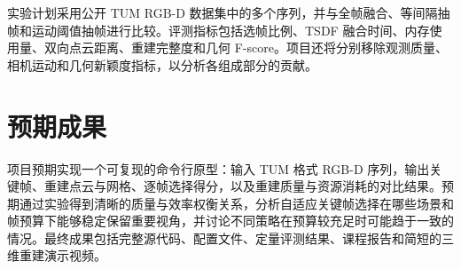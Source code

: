\documentclass[10pt,a4paper]{ctexart}
\begin{document}
实验计划采用公开 TUM RGB-D 数据集中的多个序列，并与全帧融合、等间隔抽帧和运动阈值抽帧进行比较。评测指标包括选帧比例、TSDF 融合时间、内存使用量、双向点云距离、重建完整度和几何 F-score。项目还将分别移除观测质量、相机运动和几何新颖度指标，以分析各组成部分的贡献。

\section{预期成果}
项目预期实现一个可复现的命令行原型：输入 TUM 格式 RGB-D 序列，输出关键帧、重建点云与网格、逐帧选择得分，以及重建质量与资源消耗的对比结果。预期通过实验得到清晰的质量与效率权衡关系，分析自适应关键帧选择在哪些场景和帧预算下能够稳定保留重要视角，并讨论不同策略在预算较充足时可能趋于一致的情况。最终成果包括完整源代码、配置文件、定量评测结果、课程报告和简短的三维重建演示视频。
\end{document}
